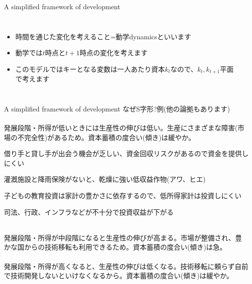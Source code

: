 \begin{frame}[label=DetailedPovTrapFig]{}

\end{frame}


\begin{frame}[label=PovTrapFig]{A simplified framework of development}
\begin{columns}[T]

\begin{itemize}
\vspace{1.0ex}\setlength{\itemsep}{1.0ex}\setlength{\baselineskip}{12pt}
\item	時間を通じた変化を考えること=動学dynamicsといいます
\item	動学では$t$時点と$t+1$時点の変化を考えます
\item	このモデルではキーとなる変数は一人あたり資本$k_{t}$なので、$k_{t}, k_{t+1}$平面で考えます
\end{itemize}
\hfill\hyperlink{WhyS<3>}{}\hfill\hyperlink{changeequilibria<3>}{}
\\
\end{columns}
\end{frame}

\begin{frame}[label=WhyS]{A simplified framework of development}
なぜS字形?\pause 例(他の論拠もあります)\\~\\

\pause
発展段階・所得が低いときには生産性の伸びは低い。生産にさまざまな障害(市場の不完全性)があるため。資本蓄積の度合い(傾き)は緩やか。\hfill\hyperlink{PovTrapFig<5>}{}
\begin{description}[市場に関わる制度]\footnotesize
\vspace{1.0ex}\setlength{\itemsep}{1.0ex}\setlength{\baselineskip}{12pt}
\pause
\item[資本市場] 借り手と貸し手が出会う機会が乏しい、資金回収リスクがあるので資金を提供しにくい
\pause
\item[保険市場] 灌漑施設と降雨保険がないと、乾燥に強い低収益作物(アワ、ヒエ)
\pause
\item[貸出市場] 子どもの教育投資は家計の豊かさに依存するので、低所得家計は投資しにくい
\pause
\item[市場に関わる制度] 司法、行政、インフラなどが不十分で投資収益が下がる\\~\\
\end{description}
\pause
発展段階・所得が中段階になると生産性の伸びが高まる。市場が整備され、豊かな国からの技術移転も利用できるため。資本蓄積の度合い(傾き)は急。\\~\\

\pause
発展段階・所得が高くなると、生産性の伸びは低くなる。技術移転に頼らず自前で技術開発しないといけなくなるから。資本蓄積の度合い(傾き)は緩やか。
\hfill\hyperlink{PovTrapFig<5>}{}
\end{frame}

